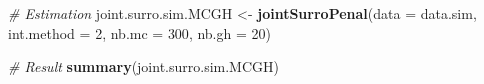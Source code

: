 \documentclass[]{article}
\newenvironment{Shaded}{\begin{snugshade}}{\end{snugshade}}
\newcommand{\KeywordTok}[1]{\textcolor[rgb]{0.13,0.29,0.53}{\textbf{#1}}}
\newcommand{\DataTypeTok}[1]{\textcolor[rgb]{0.13,0.29,0.53}{#1}}
\newcommand{\DecValTok}[1]{\textcolor[rgb]{0.00,0.00,0.81}{#1}}
\newcommand{\StringTok}[1]{\textcolor[rgb]{0.31,0.60,0.02}{#1}}
\newcommand{\CommentTok}[1]{\textcolor[rgb]{0.56,0.35,0.01}{\textit{#1}}}
\newcommand{\NormalTok}[1]{#1}
\begin{document}
\begin{Shaded}
\begin{Highlighting}[]
\CommentTok{# Estimation}
\NormalTok{joint.surro.sim.MCGH <-}\StringTok{ }\KeywordTok{jointSurroPenal}\NormalTok{(}\DataTypeTok{data =}\NormalTok{ data.sim, }\DataTypeTok{int.method =} \DecValTok{2}\NormalTok{,}
    \DataTypeTok{nb.mc =} \DecValTok{300}\NormalTok{, }\DataTypeTok{nb.gh =} \DecValTok{20}\NormalTok{)}
\end{Highlighting}
\end{Shaded}

\begin{Shaded}
\begin{Highlighting}[]
\CommentTok{# Result}
\KeywordTok{summary}\NormalTok{(joint.surro.sim.MCGH)}
\end{Highlighting}
\end{Shaded}
\end{document}
